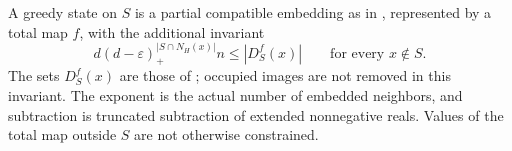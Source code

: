 \begin{definition}
A greedy state on $S$ is a partial compatible embedding as in
, represented by a total map $f$,
with the additional invariant
\[
 d(d-\varepsilon)_+^{|S\cap N_H(x)|}n\leq |D_S^f(x)|
                  \qquad\text{for every }x\notin S.
\]
The sets $D_S^f(x)$ are those of ; occupied
images are not removed in this invariant. The exponent is the actual
number of embedded neighbors, and subtraction is truncated subtraction
of extended nonnegative reals. Values of the total map outside $S$
are not otherwise constrained.
\end{definition}
